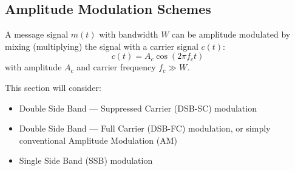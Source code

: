 \documentclass{article}
\begin{document}
\subsection{Amplitude Modulation Schemes}
A message signal \(m\left( t \right)\) with bandwidth \(W\) can be amplitude modulated by
mixing (multiplying) the signal with a carrier signal \(c\left( t \right)\):
\begin{equation*}
    c\left( t \right) = A_c \cos{\left( 2 \pi f_c t \right)}
\end{equation*}
with amplitude \(A_c\) and carrier frequency \(f_c \gg W\).

This section will consider:
\begin{itemize}
    \item Double Side Band --- Suppressed Carrier (DSB-SC) modulation
    \item Double Side Band --- Full Carrier (DSB-FC) modulation, or simply conventional Amplitude Modulation (AM)
    \item Single Side Band (SSB) modulation
\end{itemize}
\end{document}
